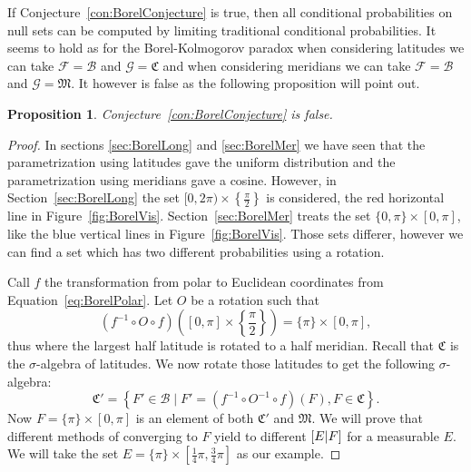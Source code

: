 \documentclass[a4paper]{report}
\theoremstyle{plain}
\newtheorem{proposition}[theorem]{Proposition}
\theoremstyle{definition}
\theoremstyle{remark}
\numberwithin{equation}{chapter}
\let\P\relax
\DeclareMathOperator{\P}{\mathbb{P}}
\DeclareMathOperator{\1}{\mathbbm{1}}
\newcommand{\F}{\mathcal{F}}
\renewcommand{\G}{\mathcal{G}}
\newcommand{\B}{\mathcal{B}}
\begin{document}
If Conjecture~\ref{con:BorelConjecture} is true, then all conditional probabilities on null sets can be computed by limiting traditional conditional probabilities. It seems to hold as for the Borel-Kolmogorov paradox when considering latitudes we can take $\F=\B$ and $\G=\mathfrak{C}$ and when considering meridians we can take $\F=\B$ and $\G=\mathfrak{M}$. It however is false as the following proposition will point out.

\begin{proposition}\label{prop:BorelConFalse}
Conjecture~\ref{con:BorelConjecture} is false.
\end{proposition}
\begin{proof}
In sections \ref{sec:BorelLong} and \ref{sec:BorelMer} we have seen that the parametrization using latitudes gave the uniform distribution and the parametrization using meridians gave a cosine. However, in Section~\ref{sec:BorelLong} the set $[0,2\pi)\times\left\{\frac{\pi}{2}\right\}$ is considered, the red horizontal line in Figure~\ref{fig:BorelVis}. Section~\ref{sec:BorelMer} treats the set $\{0,\pi\}\times[0,\pi]$, like the blue vertical lines in Figure~\ref{fig:BorelVis}. Those sets differer, however we can find a set which has two different probabilities using a rotation.

Call $f$ the transformation from polar to Euclidean coordinates from Equation~\ref{eq:BorelPolar}. Let $O$ be a rotation such that
\begin{equation}
(f^{-1}\circ O\circ f)\left([0,\pi]\times\left\{\frac{\pi}{2}\right\}\right)=\{\pi\}\times[0,\pi],
\end{equation}
thus where the largest half latitude is rotated to a half meridian. Recall that $\mathfrak{C}$ is the $\sigma$-algebra of latitudes. We now rotate those latitudes to get the following $\sigma$-algebra:
\begin{equation}
\mathfrak{C}'=\left\{F'\in\B\mid F'=\left(f^{-1}\circ O^{-1}\circ f\right)(F),F\in\mathfrak{C}\right\}.
\end{equation}
Now $F=\{\pi\}\times[0,\pi]$ is an element of both $\mathfrak{C}'$ and $\mathfrak{M}$. We will prove that different methods of converging to $F$ yield to different $\P[E|F]$ for a measurable $E$. We will take the set $E=\{\pi\}\times\left[\frac{1}{4}\pi,\frac{3}{4}\pi\right]$ as our example.


\end{proof}
\end{document}
